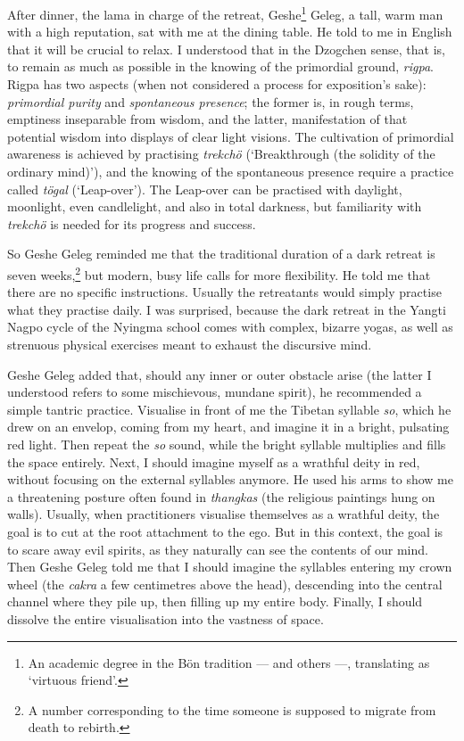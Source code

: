 \documentclass[11pt,twocolumn]{article}
\begin{document}
After dinner, the lama in charge of the retreat, Geshe\footnote{An
academic degree in the Bön tradition --- and others ---, translating
as `virtuous friend'.} Geleg, a tall, warm man with a high reputation,
sat with me at the dining table. He told to me in English that it will
be crucial to relax. I understood that in the Dzogchen sense, that is,
to remain as much as possible in the knowing of the primordial ground,
\emph{rigpa}. Rigpa has two aspects (when not considered a process for
exposition's sake): \emph{primordial purity} and \emph{spontaneous
presence}; the former is, in rough terms, emptiness inseparable from
wisdom, and the latter, manifestation of that potential wisdom into
displays of clear light visions. The cultivation of primordial
awareness is achieved by practising \emph{trekchö} (`Breakthrough (the
solidity of the ordinary mind)'), and the knowing of the spontaneous
presence require a practice called \emph{tögal}
(`Leap\hyp{}over'). The Leap\hyp{}over can be practised with daylight,
moonlight, even candlelight, and also in total darkness, but
familiarity with \emph{trekchö} is needed for its progress and
success.

So Geshe Geleg reminded me that the traditional duration of a dark
retreat is seven weeks,\footnote{A number corresponding to the time
someone is supposed to migrate from death to rebirth.} but modern,
busy life calls for more flexibility. He told me that there are no
specific instructions. Usually the retreatants would simply practise
what they practise daily. I was surprised, because the dark retreat in
the Yangti Nagpo cycle of the Nyingma school comes with complex,
bizarre yogas, as well as strenuous physical exercises meant to
exhaust the discursive mind.

Geshe Geleg added that, should any inner or outer obstacle arise (the
latter I understood refers to some mischievous, mundane spirit), he
recommended a simple tantric practice. Visualise in front of me the
Tibetan syllable \emph{so}, which he drew on an envelop, coming from
my heart, and imagine it in a bright, pulsating red light. Then repeat
the \emph{so} sound, while the bright syllable multiplies and fills
the space entirely. Next, I should imagine myself as a wrathful deity
in red, without focusing on the external syllables anymore. He used
his arms to show me a threatening posture often found in
\emph{thangkas} (the religious paintings hung on walls). Usually, when
practitioners visualise themselves as a wrathful deity, the goal is to
cut at the root attachment to the ego. But in this context, the goal
is to scare away evil spirits, as they naturally can see the contents
of our mind. Then Geshe Geleg told me that I should imagine the
syllables entering my crown wheel (the \emph{cakra} a few centimetres
above the head), descending into the central channel where they pile
up, then filling up my entire body. Finally, I should dissolve the
entire visualisation into the vastness of space.
\end{document}
